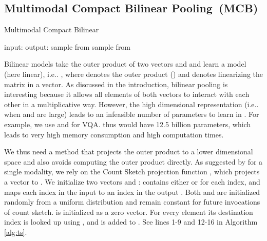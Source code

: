 \documentclass[11pt,letterpaper]{article}
\makeatletter
\DeclareRobustCommand\onedot{\futurelet\@let@token\@onedot}
\def\@onedot{\ifx\@let@token.\else.\null\fi\xspace}
\def\ie{i.e\onedot} \def\Ie{I.e\onedot}
\makeatother
\begin{document}
\subsection{Multimodal Compact Bilinear Pooling~(MCB)}
\label{sec:approach:mcb}





\begin{algorithm}
\small
\caption{Multimodal Compact Bilinear}\label{alg:ts}
\begin{algorithmic}[1]
\State input: 
\State output: 
\For{}
\For{}
\State sample  from 
\State sample  from 
\EndFor
\EndIf
\State 
\EndFor
\State 
\State \Return 
\EndProcedure

\Procedure{}{}
\State 
\For{}
\State 
\EndFor
\State \Return 
\EndProcedure
\end{algorithmic}
\end{algorithm}
Bilinear models \cite{tenenbaum00nc} take the outer product of two vectors  and  and learn a model  (here linear), \ie
, 
where   denotes the outer product () and  denotes linearizing the matrix in a vector.
As discussed in the introduction, bilinear pooling is interesting because it allows all elements of both vectors to interact with each other in a multiplicative way. 
However, the high dimensional representation (\ie when  and  are large) leads to an infeasible number of parameters to learn in . For example, we use  and   for VQA.  thus would have 12.5 billion parameters, which leads to very high memory consumption and high computation times.

We thus need a method that projects the outer product to a lower dimensional space and also avoids computing the outer product directly. As suggested by  for a single modality, we rely on the Count Sketch projection function  \cite{charikar2002countsketch}, which projects a vector  to .
We initialize two vectors   and :   contains either  or  for each index, and  maps each index  in the input  to an index  in the output . Both  and  are initialized randomly from a uniform distribution and remain constant for future invocations of count sketch.  is initialized as a zero vector. For every element     its destination index  is looked up using , and  is added to . See lines 1-9 and 12-16 in Algorithm \ref{alg:ts}.
\end{document}
